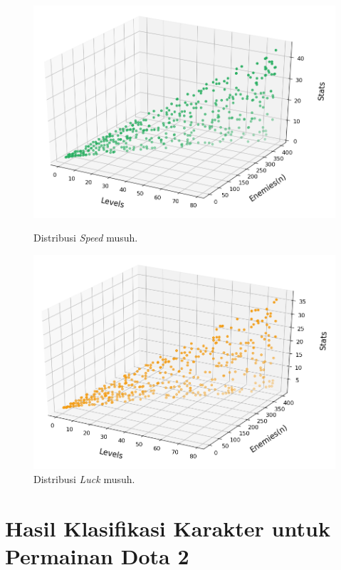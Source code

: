 \begin{figure} [!h] \centering
	\includegraphics[scale=0.6]{img/EnemySpeedDistrib.png}
	\caption{Distribusi \textit{Speed} musuh.}
	\label{fig:enemy_spd_distrib}
	\vspace{5ex}

	\includegraphics[scale=0.6]{img/EnemyLuckDistrib.png}
	\caption{Distribusi \textit{Luck} musuh.}
	\label{fig:enemy_luck_distrib}
\end{figure}
\clearpage

\section{Hasil Klasifikasi Karakter untuk Permainan Dota 2}
\label{sec:sec4_eval_dota2}
\vspace{1ex}

